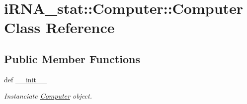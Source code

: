 \hypertarget{classiRNA__stat_1_1Computer_1_1Computer}{
\section{i\-R\-N\-A\-\_\-stat\-:\-:\-Computer\-:\-:\-Computer \-Class \-Reference}
\label{classiRNA__stat_1_1Computer_1_1Computer}
}
\subsection*{\-Public \-Member \-Functions}
\begin{DoxyCompactItemize}
\item 
def \hyperlink{classiRNA__stat_1_1Computer_1_1Computer_a93bca318e3d8f6cdf2ef3817eb6d7857}{\-\_\-\-\_\-init\-\_\-\-\_\-}
\begin{DoxyCompactList}\small\item\em \-Instanciate \hyperlink{classiRNA__stat_1_1Computer_1_1Computer}{\-Computer} object. \end{DoxyCompactList}\end{DoxyCompactItemize}
